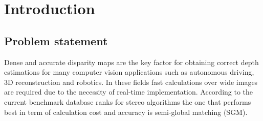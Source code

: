 \chapter{Introduction}
\label{chapter:intro}






\section{Problem statement}

Dense and accurate disparity maps are the key factor for obtaining correct depth estimations for many computer vision applications such as autonomous driving, 3D reconstruction and robotics.  
In these fields fast calculations over wide images are required due to the necessity of real-time implementation. 
According to the current benchmark database ranks for stereo algorithms the one that performs best in term of calculation cost and accuracy is semi-global matching (SGM). 

